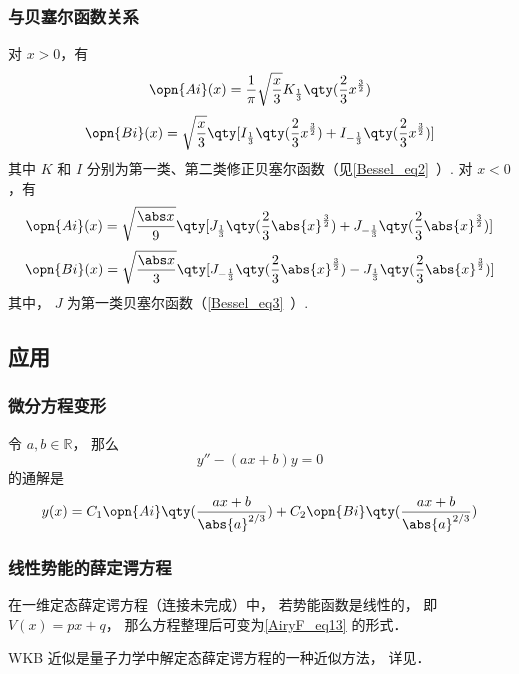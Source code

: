 \subsubsection{与贝塞尔函数关系}
对 $x>0$，有
\begin{equation}
\opn{Ai}(x)=\frac1\pi \sqrt{\frac x3} K_{\frac13} \qty(\frac23 x^{\frac32})
\end{equation}\begin{equation}
\opn{Bi}(x)=\sqrt{\frac x3} \qty[I_{\frac13}\qty(\frac23 x^{\frac32})+I_{-\frac13}\qty(\frac23 x^{\frac32})]
\end{equation}
其中 $K$ 和 $I$ 分别为第一类、第二类修正贝塞尔函数（见\autoref{Bessel_eq2}~）.
对 $x<0$，有
\begin{equation}
\opn{Ai}(x)=\sqrt{\frac{\abs x}{9}}\qty[J_{\frac13}\qty(\frac23 \abs{x}^{\frac32})+J_{-\frac13}\qty(\frac23 \abs{x}^{\frac32})]
\end{equation}
\begin{equation}
\opn{Bi}(x)=\sqrt{\frac{\abs x}{3}} \qty[J_{-\frac13}\qty(\frac23 \abs{x}^{\frac32})-J_{\frac13}\qty(\frac23 \abs{x}^{\frac32})]
\end{equation}
其中， $J$ 为第一类贝塞尔函数（\autoref{Bessel_eq3}~）.

\subsection{应用}
\subsubsection{微分方程变形}
令 $a, b\in \mathbb R$， 那么
\begin{equation}\label{AiryF_eq13}
y'' - (ax + b) y = 0
\end{equation}
的通解是
\begin{equation}\label{AiryF_eq1}
y(x) = C_1\opn{Ai}\qty(\frac{ax+b}{\abs{a}^{2/3}}) + C_2 \opn{Bi}\qty(\frac{ax+b}{\abs{a}^{2/3}})
\end{equation}

\subsubsection{线性势能的薛定谔方程}
在一维定态薛定谔方程（连接未完成）中， 若势能函数是线性的， 即 $V(x) = px + q$， 那么方程整理后可变为\autoref{AiryF_eq13} 的形式．

WKB 近似是量子力学中解定态薛定谔方程的一种近似方法， 详见．
